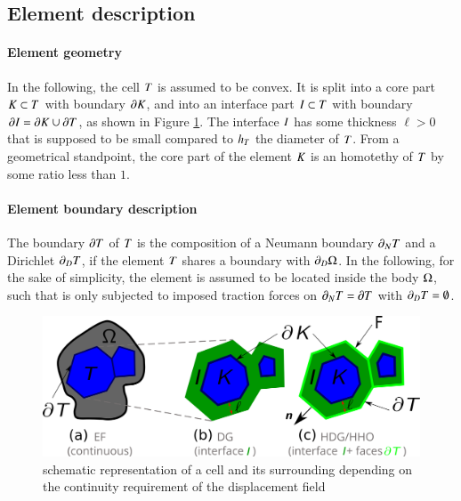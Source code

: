 \subsection{Element description}

\paragraph{Element geometry}

In the following, the cell $T$ is assumed to be convex.
It is split into a core part $K \subset T$ with boundary $\partial K$, and into an interface part $I{} \subset T$ with boundary $\partial I = \partial K \cup \partial T$, as shown in Figure \ref{fig_02}. The interface $I{}$ has some thickness $\ell > 0$ that is supposed to be small compared to $h_{T}$ the diameter of $T$.
From a geometrical standpoint, the core part of the element $K{}$ is an homotethy of $T$ by some ratio less than $1$.

\paragraph{Element boundary description} The boundary $\partial T{}$ of $T$ is the composition of a Neumann boundary $\partial_N T{}$ and a Dirichlet $\partial_D T{}$, if the element $T$ shares a boundary with $\partial_D \Omega{}$. In the following, for the sake of simplicity, the element is assumed to be located inside the body $\Omega{}$, such that is only subjected to imposed traction forces on $\partial_N T{} = \partial T{}$ with $\partial_D T{} = \emptyset$.
%
% 
% 
\begin{figure}[H]
    \centering
    \includegraphics[width=14.cm]{../chapter_002_hho_mechanics/figures/ef_dg_hdg.png}
    \caption{schematic representation of a cell and its surrounding depending on the continuity requirement of the displacement field}
    \label{fig_02}
\end{figure}
%
%
%

